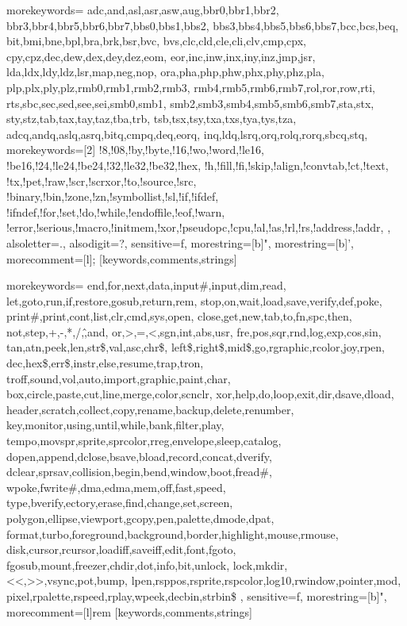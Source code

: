 %
  {morekeywords={%
    adc,and,asl,asr,asw,aug,bbr0,bbr1,bbr2,%
    bbr3,bbr4,bbr5,bbr6,bbr7,bbs0,bbs1,bbs2,%
    bbs3,bbs4,bbs5,bbs6,bbs7,bcc,bcs,beq,%
    bit,bmi,bne,bpl,bra,brk,bsr,bvc,%
    bvs,clc,cld,cle,cli,clv,cmp,cpx,%
    cpy,cpz,dec,dew,dex,dey,dez,eom,%
    eor,inc,inw,inx,iny,inz,jmp,jsr,%
    lda,ldx,ldy,ldz,lsr,map,neg,nop,%
    ora,pha,php,phw,phx,phy,phz,pla,%
    plp,plx,ply,plz,rmb0,rmb1,rmb2,rmb3,%
    rmb4,rmb5,rmb6,rmb7,rol,ror,row,rti,%
    rts,sbc,sec,sed,see,sei,smb0,smb1,%
    smb2,smb3,smb4,smb5,smb6,smb7,sta,stx,%
    sty,stz,tab,tax,tay,taz,tba,trb,%
    tsb,tsx,tsy,txa,txs,tya,tys,tza,%
    adcq,andq,aslq,asrq,bitq,cmpq,deq,eorq,%
    inq,ldq,lsrq,orq,rolq,rorq,sbcq,stq},%
  morekeywords=[2]{%
    !8,!08,!by,!byte,!16,!wo,!word,!le16,%
    !be16,!24,!le24,!be24,!32,!le32,!be32,!hex,%
    !h,!fill,!fi,!skip,!align,!convtab,!ct,!text,%
    !tx,!pet,!raw,!scr,!scrxor,!to,!source,!src,%
    !binary,!bin,!zone,!zn,!symbollist,!sl,!if,!ifdef,%
    !ifndef,!for,!set,!do,!while,!endoffile,!eof,!warn,%
    !error,!serious,!macro,!initmem,!xor,!pseudopc,!cpu,!al,!as,!rl,!rs,!address,!addr,
  },%
  alsoletter=.,%
  alsodigit=?,%
  sensitive=f,%
  morestring=[b]",%
  morestring=[b]',%
  morecomment=[l]{;}%
  }[keywords,comments,strings]

%
  {morekeywords={%
    end,for,next,data,input\#,input,dim,read,%
    let,goto,run,if,restore,gosub,return,rem,%
    stop,on,wait,load,save,verify,def,poke,%
    print\#,print,cont,list,clr,cmd,sys,open,%
    close,get,new,tab,to,fn,spc,then,%
    not,step,+,-,*,/,\^,and,%
    or,>,=,<,sgn,int,abs,usr,%
    fre,pos,sqr,rnd,log,exp,cos,sin,%
    tan,atn,peek,len,str\$,val,asc,chr\$,%
    left\$,right\$,mid\$,go,rgraphic,rcolor,joy,rpen,%
    dec,hex\$,err\$,instr,else,resume,trap,tron,%
    troff,sound,vol,auto,import,graphic,paint,char,%
    box,circle,paste,cut,line,merge,color,scnclr,%
    xor,help,do,loop,exit,dir,dsave,dload,%
    header,scratch,collect,copy,rename,backup,delete,renumber,%
    key,monitor,using,until,while,bank,filter,play,%
    tempo,movspr,sprite,sprcolor,rreg,envelope,sleep,catalog,%
    dopen,append,dclose,bsave,bload,record,concat,dverify,%
    dclear,sprsav,collision,begin,bend,window,boot,fread\#,%
    wpoke,fwrite\#,dma,edma,mem,off,fast,speed,%
    type,bverify,ectory,erase,find,change,set,screen,%
    polygon,ellipse,viewport,gcopy,pen,palette,dmode,dpat,%
    format,turbo,foreground,background,border,highlight,mouse,rmouse,%
    disk,cursor,rcursor,loadiff,saveiff,edit,font,fgoto,%
    fgosub,mount,freezer,chdir,dot,info,bit,unlock,%
    lock,mkdir,<<,>>,vsync,pot,bump,%
    lpen,rsppos,rsprite,rspcolor,log10,rwindow,pointer,mod,%
    pixel,rpalette,rspeed,rplay,wpeek,decbin,strbin\$%
  },%
  sensitive=f,%
  morestring=[b]",%
  morecomment=[l]{rem }%
  }[keywords,comments,strings]

